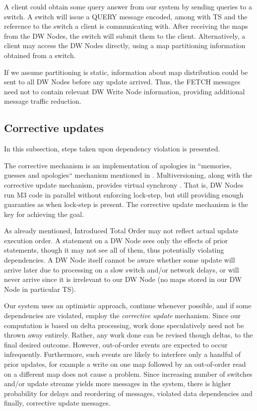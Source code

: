\documentclass{sig-semester}
\def\M3{M3\xspace}
\def\EXORD{actual update execution order\xspace}
\begin{document}
A client could obtain some query answer from our system by sending queries to a switch. A switch will issue a QUERY message encoded, among with TS and the reference to the switch a client is communicating with. After receiving the maps from the DW Nodes, the switch will submit them to the client. Alternatively, a client may access the DW Nodes directly, using a map partitioning information obtained from a switch.

If we assume partitioning is static, information about map distribution could be sent to all DW Nodes before any update arrived. Thus, the FETCH messages need not to contain relevant DW Write Node information, providing additional message traffic reduction.

\subsection{Corrective updates}
\label{Corrective}
In this subsection, steps taken upon dependency violation is presented. 

The corrective mechanism is an implementation of apologies in ``memories, guesses and apologies`` mechanism mentioned in \cite{helland09}. Multiversioning, along with the corrective update mechanism, provides virtual synchrony \cite{Birman87a}. That is, DW Nodes run \M3 code in parallel without enforcing lock-step, but still providing enough guaranties as when lock-step is present. The corrective update mechanism is the key for achieving the goal.

As already mentioned, Introduced Total Order may not reflect \EXORD. A statement on a DW Node sees only the effects of prior statements, though it may not see all of them, thus potentially violating dependencies. A DW Node itself cannot be aware whether some update will arrive later due to processing on a slow switch and/or network delays, or will never arrive since it is irrelevant to our DW Node (no maps stored in our DW Node in particular TS).

Our system uses an optimistic approach, continue whenever possible, and if some dependencies are violated, employ the \textit{corrective update} mechanism. Since our computation is based on delta processing, work done speculatively need not be thrown away entirely. Rather, any work done can be revised though deltas, to the final desired outcome. However, out-of-order events are expected to occur infrequently. Furthermore, such events are likely to interfere only a handful of prior updates, for example a write on one map followed by an out-of-order read on a different map does not cause a problem. Since increasing number of switches and/or update streams yields more messages in the system, there is higher probability for delays and reordering of messages, violated data dependencies and finally, corrective update messages.
\end{document}
